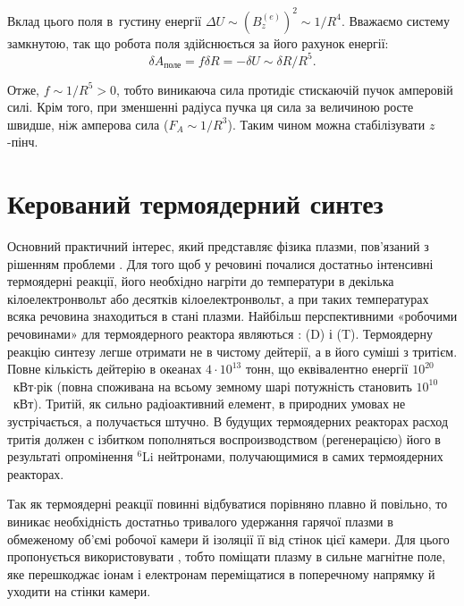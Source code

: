 Вклад цього поля в~густину енергії $\Delta U \sim (B_z^{(e)})^2 \sim 1/R^4$. Вважаємо систему замкнутою, так що робота поля здійснюється за його рахунок енергії:
\begin{equation*}
	\delta A_{\text{поле}} = f\delta R = -\delta U \sim \delta R/R^5.
\end{equation*}

Отже, $f \sim 1/R^5 > 0$, тобто виникаюча сила протидіє стискаючій пучок амперовій силі. Крім того, при зменшенні радіуса пучка ця сила за величиною росте швидше, ніж амперова сила ($F_A \sim 1/R^3$). Таким чином можна стабілізувати $z$-пінч.

\section{Керований термоядерний синтез}\label{sec:fusion}

Основний практичний інтерес, який представляє фізика плазми, пов'язаний з рішенням проблеми . Для того щоб у речовині почалися достатньо інтенсивні термоядерні реакції, його необхідно нагріти до температури в декілька кілоелектронвольт або десятків кілоелектронвольт, а при таких температурах всяка речовина знаходиться в стані плазми. Найбільш перспективними «робочими речовинами» для термоядерного реактора являються :  (D) і  (T). Термоядерну реакцію синтезу легше отримати не в чистому дейтерії, а в його суміші з тритієм. Повне кількість дейтерію в океанах $4\cdot10^{13}$ тонн, що еквівалентно енергії $10^{20}$~кВт$\cdot$рік (повна споживана на всьому земному шарі потужність становить $10^{10}$~кВт). Тритій, як сильно радіоактивний елемент, в природних умовах не зустрічається, а получається штучно. В будущих термоядерних реакторах расход тритія должен с ізбитком пополняться воспроизводством (регенерацією) його в результаті опромінення $^6$Li нейтронами, получающимися в самих термоядерних реакторах.

Так як термоядерні реакції повинні відбуватися порівняно плавно й повільно, то виникає необхідність достатньо тривалого удержання гарячої плазми в обмеженому об'ємі робочої камери й ізоляції її від стінок цієї камери. Для цього пропонується використовувати , тобто поміщати плазму в сильне магнітне поле, яке перешкоджає іонам і електронам переміщатися в поперечному напрямку й уходити на стінки камери.

